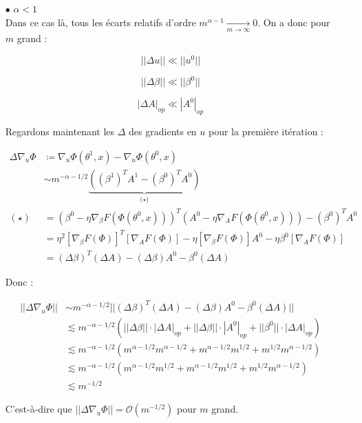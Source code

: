 \documentclass[a4paper, 11pt, french]{article}
\begin{document}
	\begin{itemize}
		\item[$\bullet$] $\alpha < 1$ \\
		
		Dans ce cas là, tous les écarts relatifs d'ordre $m^{\alpha - 1} \xrightarrow[m \to \infty]{} 0$. On a donc pour $m$ grand :
		
		\[||\Delta u|| \ll ||u^0||\]
		
		\[||\Delta \beta|| \ll ||\beta^0||\]
		
		\[|\Delta A|_{op} \ll |A^0|_{op}\]

		Regardons maintenant les $\Delta$ des gradients en $u$ pour la première itération :
		
		\begin{align}
			\Delta \nabla_u \Phi &\coloneqq \nabla_u \Phi (\theta^1, x) -  \nabla_u \Phi (\theta^0, x) \\
			&\sim m^{-\alpha - 1/2} \underbrace{((\beta^1)^T A^1 - (\beta^0)^T A^0)}_\text{($\star$)} \\
			 (\star) &= (\beta^0 - \eta \nabla_{\beta} F(\Phi(\theta^0, x)))^T (A^0 - \eta \nabla_{A} F(\Phi(\theta^0, x))) - (\beta^0)^T A^0 \\
			&= \eta^2 [\nabla_{\beta} F(\Phi)]^T[\nabla_{A} F(\Phi)] - \eta [\nabla_{\beta} F(\Phi)] A^0 - \eta \beta^0 [\nabla_{A} F(\Phi)] \\
			&= (\Delta \beta)^T(\Delta A) - (\Delta \beta) A^0 -  \beta^0 (\Delta A)
		\end{align}
	
	Donc :
	
	\begin{align}
		||\Delta \nabla_u \Phi|| &\sim m^{-\alpha - 1/2} ||(\Delta \beta)^T(\Delta A) - (\Delta \beta) A^0 -  \beta^0 (\Delta A)|| \\
		&\lesssim m^{-\alpha - 1/2} (||\Delta \beta|| \cdot |\Delta A|_{op} + ||\Delta \beta|| \cdot |A^0|_{op} + ||\beta^0|| \cdot |\Delta A|_{op}) \\
		&\lesssim m^{-\alpha - 1/2} (m^{\alpha - 1/2}m^{\alpha - 1/2} + m^{\alpha - 1/2}m^{1/2} + m^{1/2}m^{\alpha - 1/2}) \\
		&\lesssim m^{-\alpha - 1/2} (m^{\alpha - 1/2}m^{1/2} + m^{\alpha - 1/2}m^{1/2} + m^{1/2}m^{\alpha - 1/2}) \\
		&\lesssim m^{-1/2}
	\end{align}

	C'est-à-dire que $||\Delta \nabla_u \Phi|| = \mathcal{O}(m^{-1/2})$ pour $m$ grand. \\
	

\end{itemize}
\end{document}
